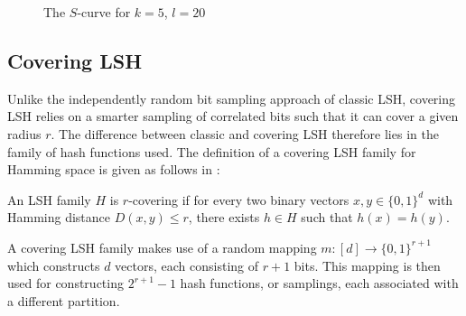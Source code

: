 \begin{figure}[ht]

  \caption{The $S$-curve for $k = 5$, $l = 20$}
\end{figure}

\subsection{Covering LSH}
\label{background-covering-lsh}

Unlike the independently random bit sampling approach of classic LSH, covering LSH relies on a smarter sampling of correlated bits such that it can cover a given radius $r$. The difference between classic and covering LSH therefore lies in the family of hash functions used. The definition of a covering LSH family for Hamming space is given as follows in \cite{DBLP:journals/corr/PhamP16}:

\begin{definition}
\label{definition-covering-family}
  An LSH family $H$ is $r$-covering if for every two binary vectors $x, y \in \{0, 1\}^d$ with Hamming distance $D(x, y) \leq r$, there exists $h \in H$ such that $h(x) = h(y)$.
\end{definition}

A covering LSH family makes use of a random mapping $m \colon [d] \rightarrow \{0, 1\}^{r + 1}$ which constructs $d$ vectors, each consisting of $r + 1$ bits. This mapping is then used for constructing $2^{r + 1} - 1$ hash functions, or samplings, each associated with a different partition.
